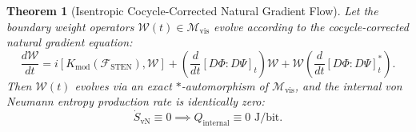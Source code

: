 \documentclass[11pt,onecolumn]{article}
\newtheorem{theorem}{Theorem}
\begin{document}
\begin{theorem}[Isentropic Cocycle-Corrected Natural Gradient Flow]
\label{thm:zero_heat_flow}
Let the boundary weight operators $\mathcal{W}(t) \in \mathcal{M}_{\text{vis}}$ evolve according to the cocycle-corrected natural gradient equation:
\begin{equation}
    \frac{d\mathcal{W}}{dt} = i \left[ K_{\text{mod}}(\mathcal{F}_{\text{STEN}}), \mathcal{W} \right] + \left( \frac{d}{dt} [D\Phi : D\Psi]_t \right) \mathcal{W} + \mathcal{W} \left( \frac{d}{dt} [D\Phi : D\Psi]_t^* \right).
    \label{eq:cocycle_flow_ode}
\end{equation}
Then $\mathcal{W}(t)$ evolves via an exact $*$-automorphism of $\mathcal{M}_{\text{vis}}$, and the internal von Neumann entropy production rate is identically zero:
\begin{equation}
    \dot{S}_{\text{vN}} \equiv 0 \implies Q_{\text{internal}} \equiv 0\text{ J/bit}.
\end{equation}
\end{theorem}
\end{document}
